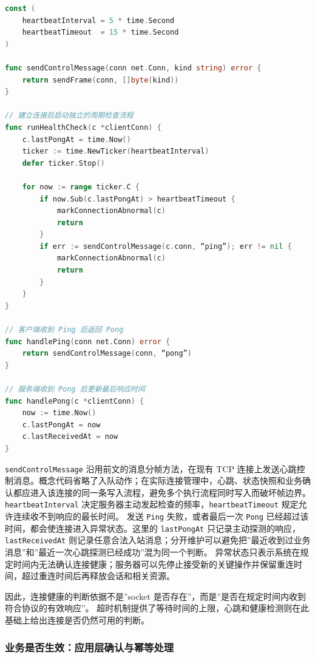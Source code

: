 \begin{tcolorbox}[title=应用层心跳与连接健康检查（概念示例）]
\begin{lstlisting}[style=codeblock, language=go]
const (
    heartbeatInterval = 5 * time.Second
    heartbeatTimeout  = 15 * time.Second
)

func sendControlMessage(conn net.Conn, kind string) error {
    return sendFrame(conn, []byte(kind))
}

// 建立连接后启动独立的周期检查流程
func runHealthCheck(c *clientConn) {
    c.lastPongAt = time.Now()
    ticker := time.NewTicker(heartbeatInterval)
    defer ticker.Stop()

    for now := range ticker.C {
        if now.Sub(c.lastPongAt) > heartbeatTimeout {
            markConnectionAbnormal(c)
            return
        }
        if err := sendControlMessage(c.conn, “ping”); err != nil {
            markConnectionAbnormal(c)
            return
        }
    }
}

// 客户端收到 Ping 后返回 Pong
func handlePing(conn net.Conn) error {
    return sendControlMessage(conn, “pong”)
}

// 服务端收到 Pong 后更新最后响应时间
func handlePong(c *clientConn) {
    now := time.Now()
    c.lastPongAt = now
    c.lastReceivedAt = now
}
\end{lstlisting}
\end{tcolorbox}

\texttt{sendControlMessage} 沿用前文的消息分帧方法，在现有 TCP 连接上发送心跳控制消息。概念代码省略了入队动作；在实际连接管理中，心跳、状态快照和业务确认都应进入该连接的同一条写入流程，避免多个执行流程同时写入而破坏帧边界。
\texttt{heartbeatInterval} 决定服务器主动发起检查的频率，\texttt{heartbeatTimeout} 规定允许连续收不到响应的最长时间。
发送 \texttt{Ping} 失败，或者最后一次 \texttt{Pong} 已经超过该时间，都会使连接进入异常状态。这里的 \texttt{lastPongAt} 只记录主动探测的响应，\texttt{lastReceivedAt} 则记录任意合法入站消息；分开维护可以避免把”最近收到过业务消息”和”最近一次心跳探测已经成功”混为同一个判断。
异常状态只表示系统在规定时间内无法确认连接健康；服务器可以先停止接受新的关键操作并保留重连时间，超过重连时间后再释放会话和相关资源。

因此，连接健康的判断依据不是”socket 是否存在”，而是”是否在规定时间内收到符合协议的有效响应”。
超时机制提供了等待时间的上限，心跳和健康检测则在此基础上给出连接是否仍然可用的判断。

\subsubsection{业务是否生效：应用层确认与幂等处理}\label{sec2:e2e-ack}

